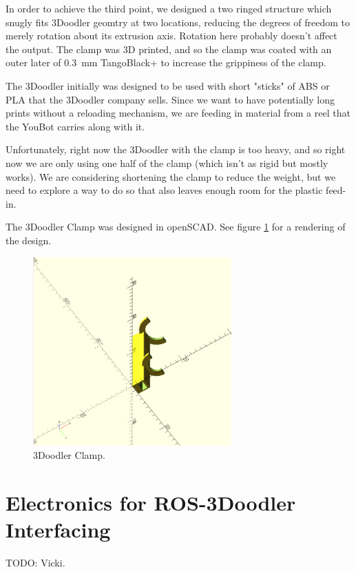\documentclass[conference]{acmsiggraph}
\begin{document}
In order to achieve the third point, we designed a two ringed structure which snugly fits 3Doodler geomtry at two locations, reducing the degrees of freedom to merely rotation about its extrusion axis.  Rotation here probably doesn't affect the output.  The clamp was 3D printed, and so the clamp was coated with an outer later of 0.3~mm TangoBlack+ to increase the grippiness of the clamp.

The 3Doodler initially was designed to be used with short "sticks" of ABS or PLA that the 3Doodler company sells.  Since we want to have potentially long prints without a reloading mechanism, we are feeding in material from a reel that the YouBot carries along with it.

Unfortunately, right now the 3Doodler with the clamp is too heavy, and so right now we are only using one half of the clamp (which isn't as rigid but mostly works).  We are considering shortening the clamp to reduce the weight, but we need to explore a way to do so that also leaves enough room for the plastic feed-in.

The 3Doodler Clamp was designed in openSCAD.  See figure \ref{fig:clamp} for a rendering of the design.

\begin{figure}[ht]
  \centering
  \includegraphics[width=3.0in]{images/clamp.png}
  \caption{3Doodler Clamp.}
  \label{fig:clamp}
\end{figure}


\section{Electronics for ROS-3Doodler Interfacing}
TODO: Vicki.
\end{document}
